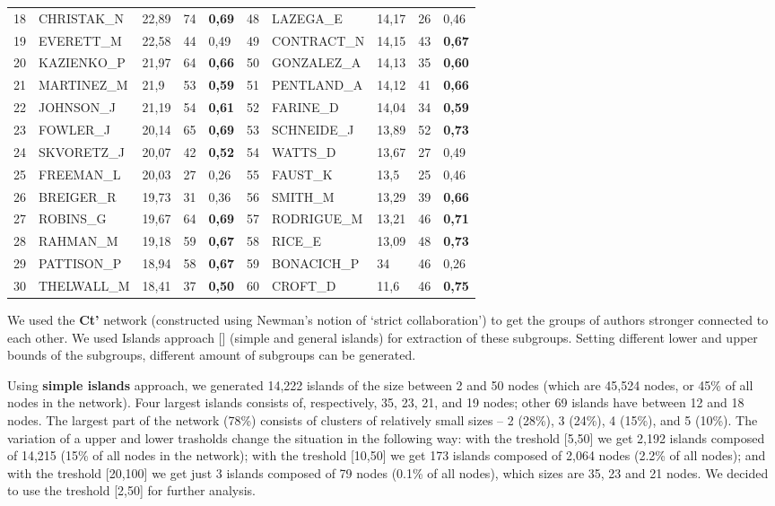 \documentclass[11pt]{article} %
\begin{document}
\begin{table}
\begin{tabular}{c|l|p{1cm}|p{1cm}|p{1.5cm}||c|l|p{1cm}|p{1cm}|p{1.5cm}|}
18& 	CHRISTAK\_N& 	22,89& 	74& 	\textbf{0,69}& 	48& 	LAZEGA\_E& 	14,17& 	26& 	0,46\\
19& 	EVERETT\_M& 	22,58& 	44& 	0,49& 		49& 	CONTRACT\_N& 	14,15& 	43& 	\textbf{0,67}\\
20& 	KAZIENKO\_P& 	21,97& 	64& 	\textbf{0,66}& 	50& 	GONZALEZ\_A& 	14,13& 	35& 	\textbf{0,60}\\
21& 	MARTINEZ\_M& 	21,9& 	53& 	\textbf{0,59}& 	51& 	PENTLAND\_A& 	14,12& 	41& 	\textbf{0,66}\\
22& 	JOHNSON\_J& 	21,19& 	54& 	\textbf{0,61}& 	52& 	FARINE\_D& 	14,04& 	34& 	\textbf{0,59}\\
23& 	FOWLER\_J& 	20,14& 	65& 	\textbf{0,69}& 	53& 	SCHNEIDE\_J& 	13,89& 	52& 	\textbf{0,73}\\
24& 	SKVORETZ\_J& 	20,07& 	42& 	\textbf{0,52}& 	54& 	WATTS\_D& 	13,67& 	27& 	0,49\\
25& 	FREEMAN\_L& 	20,03& 	27& 	0,26& 		55& 		FAUST\_K& 	13,5& 	25& 	0,46\\
26& 	BREIGER\_R& 	19,73& 	31& 	0,36& 		56& 	SMITH\_M& 	13,29& 	39& 	\textbf{0,66}\\
27& 	ROBINS\_G& 	19,67& 	64& 	\textbf{0,69}& 	57& 	RODRIGUE\_M& 	13,21& 	46& 	\textbf{0,71}\\
28& 	RAHMAN\_M& 	19,18& 	59& 	\textbf{0,67}& 	58& 	RICE\_E& 	13,09& 	48& 	\textbf{0,73}\\
29& 	PATTISON\_P& 	18,94& 	58& 	\textbf{0,67} & 59& 	 BONACICH\_P	& 34	& 46	& 0,26	\\
30& 	THELWALL\_M& 	18,41& 	37& 	\textbf{0,50} & 60& 	 CROFT\_D	& 11,6	& 46	& \textbf{0,75} \\
\end{tabular}
\end{table}

We used the \textbf{Ct'} network (constructed using Newman's notion of `strict collaboration') to get the groups of authors stronger connected to each other. We used Islands approach [] (simple and general islands) for extraction of these subgroups. Setting different lower and upper bounds of the subgroups, different amount of subgroups can be generated. \medskip 

Using \textbf{simple islands} approach, we generated 14,222 islands of the size between 2 and 50 nodes (which are 45,524 nodes, or 45\% of all nodes in the network). Four largest islands consists of, respectively, 35, 23, 21, and 19 nodes; other 69 islands have between 12 and 18 nodes. The largest part of the network (78\%) consists of clusters of relatively small sizes -- 2 (28\%), 3 (24\%), 4 (15\%), and 5 (10\%). The variation of a upper and lower trasholds change the situation in the following way: with the treshold [5,50] we get 2,192 islands composed of 14,215 (15\% of all nodes in the network); with the treshold [10,50] we get 173 islands composed of 2,064 nodes (2.2\% of all nodes); and with the treshold [20,100] we get just 3 islands composed of 79 nodes (0.1\% of all nodes), which sizes are 35, 23 and 21 nodes. We decided to use the treshold [2,50] for further analysis. \medskip  
\end{document}
